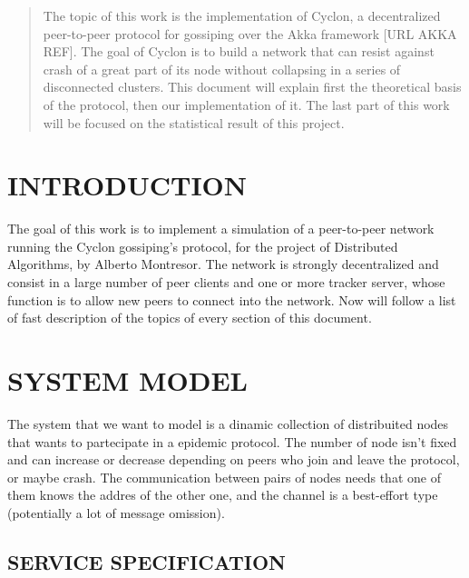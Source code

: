\documentclass[a4paper,12pt,notitlepage]{article} %
\begin{document}

\begin{abstract}
   	 	
    The topic of this work is the implementation of Cyclon, a decentralized
    peer-to-peer protocol for gossiping over the Akka framework [URL AKKA REF].
    The goal of Cyclon is to build a network that can resist against crash of 
    a great part of its node without  collapsing in a series of disconnected clusters.
    This document will explain first the theoretical basis of the protocol, then 
    our implementation of it. The last part of this work will be focused on the statistical
    result of this project.
  

\end{abstract}
\newpage



\section{INTRODUCTION}

The goal of this work is to implement a simulation of a peer-to-peer network running
 the Cyclon gossiping's protocol, for the project of Distributed Algorithms, by Alberto Montresor. 
 The network is strongly decentralized and consist in a 
 large number of peer clients and one or more tracker server, whose function is to allow new 
 peers to connect into the network. Now will follow a list of fast description of the topics of every
 section of this document.



\section{SYSTEM MODEL}

The system that we want to model is a dinamic collection of distribuited nodes that wants to partecipate in
 a epidemic protocol. The number of node isn't fixed and can increase or decrease depending on peers who
 join and leave the protocol, or maybe crash. 
 The communication between pairs of nodes needs that one 
 of them knows the addres of the other one, and the channel is a best-effort type (potentially a lot of 
 message omission). 


\subsection{SERVICE SPECIFICATION}
\end{document}
